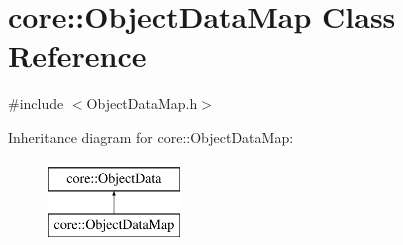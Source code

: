 \hypertarget{classcore_1_1ObjectDataMap}{}\section{core\+:\+:Object\+Data\+Map Class Reference}
\label{classcore_1_1ObjectDataMap}


{\ttfamily \#include $<$Object\+Data\+Map.\+h$>$}

Inheritance diagram for core\+:\+:Object\+Data\+Map\+:\begin{figure}[H]
\begin{center}
\leavevmode
\includegraphics[height=2.000000cm]{classcore_1_1ObjectDataMap}
\end{center}
\end{figure}
